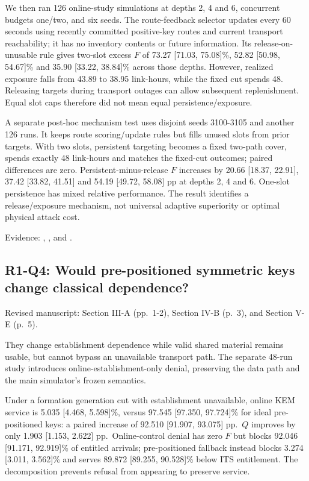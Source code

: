 \documentclass[a4paper,11pt]{article}
\begin{document}
We then ran 126 online-study simulations at depths 2, 4 and 6, concurrent budgets one/two, and six seeds. The route-feedback selector updates every 60 seconds using recently committed positive-key routes and current transport reachability; it has no inventory contents or future information. Its release-on-unusable rule gives two-slot excess \(F\) of 73.27 {[}71.03, 75.08{]}\%, 52.82 {[}50.98, 54.67{]}\% and 35.90 {[}33.22, 38.84{]}\% across those depths. However, realized exposure falls from 43.89 to 38.95 link-hours, while the fixed cut spends 48. Releasing targets during transport outages can allow subsequent replenishment. Equal slot caps therefore did not mean equal persistence/exposure.

A separate post-hoc mechanism test uses disjoint seeds 3100-3105 and another 126 runs. It keeps route scoring/update rules but fills unused slots from prior targets. With two slots, persistent targeting becomes a fixed two-path cover, spends exactly 48 link-hours and matches the fixed-cut outcomes; paired differences are zero. Persistent-minus-release \(F\) increases by 20.66 {[}18.37, 22.91{]}, 37.42 {[}33.82, 41.51{]} and 54.19 {[}49.72, 58.08{]} pp at depths 2, 4 and 6. One-slot persistence has mixed relative performance. The result identifies a release/exposure mechanism, not universal adaptive superiority or optimal physical attack cost.

Evidence: , , and .

\subsection{R1-Q4: Would pre-positioned symmetric keys change classical dependence?}\label{r1-q4-would-pre-positioned-symmetric-keys-change-classical-dependence}

Revised manuscript: Section III-A (pp.~1-2), Section IV-B (p.~3), and Section V-E (p.~5).

They change establishment dependence while valid shared material remains usable, but cannot bypass an unavailable transport path. The separate 48-run study introduces online-establishment-only denial, preserving the data path and the main simulator's frozen semantics.

Under a formation generation cut with establishment unavailable, online KEM service is 5.035 {[}4.468, 5.598{]}\%, versus 97.545 {[}97.350, 97.724{]}\% for ideal pre-positioned keys: a paired increase of 92.510 {[}91.907, 93.075{]} pp.~\(Q\) improves by only 1.903 {[}1.153, 2.622{]} pp.~Online-control denial has zero \(F\) but blocks 92.046 {[}91.171, 92.919{]}\% of entitled arrivals; pre-positioned fallback instead blocks 3.274 {[}3.011, 3.562{]}\% and serves 89.872 {[}89.255, 90.528{]}\% below ITS entitlement. The decomposition prevents refusal from appearing to preserve service.
\end{document}

